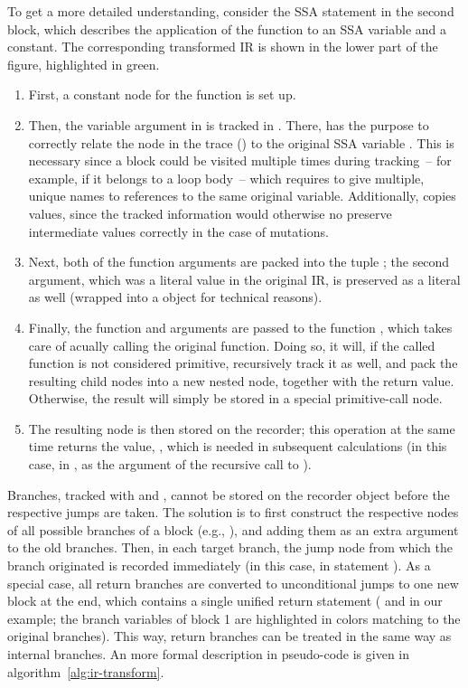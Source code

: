 To get a more detailed understanding, consider the SSA statement  in the second
block, which describes the application of the function \jlinl{+} to an SSA variable and a constant.
The corresponding transformed IR is shown in the lower part of the figure, highlighted in green.
\begin{enumerate}
  \firmlist
\item First, a constant node  for the function is set up.
\item Then, the variable argument in is tracked in .  There,  has
  the purpose to correctly relate the node in the trace () to the original SSA variable
  .  This is necessary since a block could be visited multiple times during tracking~--
  for example, if it belongs to a loop body~-- which requires to give multiple, unique names to
  references to the same original variable.  Additionally,  copies values,
  since the tracked information would otherwise no preserve intermediate values correctly in the
  case of mutations.
\item Next, both of the function arguments are packed into the tuple ; the second
  argument, which was a literal value  in the original IR, is preserved as a literal as
  well (wrapped into a  object for technical reasons).
\item Finally, the function and arguments are passed to the function , which
  takes care of acually calling the original function.  Doing so, it will, if the called function is
  not considered primitive, recursively track it as well, and pack the resulting child nodes into a
  new nested node, together with the return value.  Otherwise, the result will simply be stored in a
  special primitive-call node.
\item The resulting node is then stored on the recorder; this operation at the same time returns the
  value, , which is needed in subsequent calculations (in this case, in , as
  the argument of the recursive call to ).
\end{enumerate}
Branches, tracked with  and , cannot be stored on the
recorder object before the respective jumps are taken.  The solution is to first construct the
respective nodes of all possible branches of a block (e.g., ), and adding them as an
extra argument to the old branches.  Then, in each target branch, the jump node from which the
branch originated is recorded immediately (in this case, in statement ).  As a special
case, all return branches are converted to unconditional jumps to one new block at the end, which
contains a single unified return statement ( and  in our example; the branch
variables of block 1 are highlighted in colors matching to the original branches).  This way, return
branches can be treated in the same way as internal branches.  An more formal description in
pseudo-code is given in algorithm~\ref{alg:ir-transform}.

